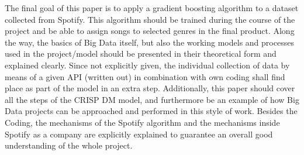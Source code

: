 The final goal of this paper is to apply a gradient boosting algorithm to a dataset collected from Spotify. 
This algorithm should be trained during the course of the project and be able to assign songs to selected genres in the final product. 
Along the way, the basics of Big Data itself, but also the working models and processes used in the project/model should be presented 
in their theoretical form and explained clearly. Since not explicitly given, the individual collection of data by means of a given API (written out) 
in combination with own coding shall find place as part of the model in an extra step. 
Additionally, this paper should cover all the steps of the \ac{CRISP DM} model, and furthermore be an example of how Big Data projects can be approached 
and performed in this style of work. Besides the Coding, the mechanisms of the Spotify algorithm and the mechanisms inside Spotify as a company are 
explicitly explained to guarantee an overall good understanding of the whole project.

